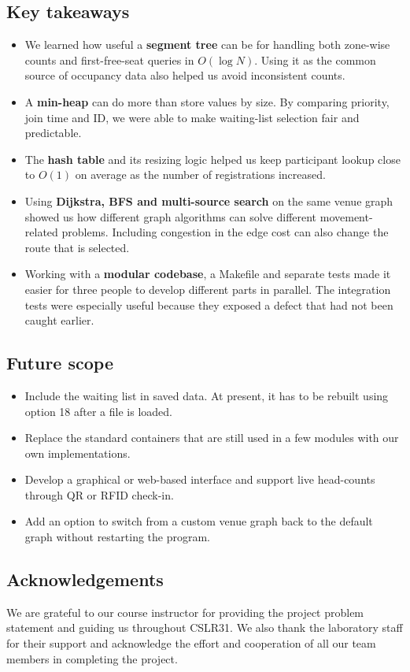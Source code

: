 \documentclass[11pt,a4paper]{article}
\begin{document}
\subsection{Key takeaways}
\begin{itemize}
  \item We learned how useful a \textbf{segment tree} can be for handling both zone-wise counts and first-free-seat queries in $O(\log N)$. Using it as the common source of occupancy data also helped us avoid inconsistent counts.
  \item A \textbf{min-heap} can do more than store values by size. By comparing priority, join time and ID, we were able to make waiting-list selection fair and predictable.
  \item The \textbf{hash table} and its resizing logic helped us keep participant lookup close to $O(1)$ on average as the number of registrations increased.
  \item Using \textbf{Dijkstra, BFS and multi-source search} on the same venue graph showed us how different graph algorithms can solve different movement-related problems. Including congestion in the edge cost can also change the route that is selected.
  \item Working with a \textbf{modular codebase}, a Makefile and separate tests made it easier for three people to develop different parts in parallel. The integration tests were especially useful because they exposed a defect that had not been caught earlier.
\end{itemize}

\subsection{Future scope}
\begin{itemize}
  \item Include the waiting list in saved data. At present, it has to be rebuilt using option 18 after a file is loaded.
  \item Replace the standard containers that are still used in a few modules with our own implementations.
  \item Develop a graphical or web-based interface and support live head-counts through QR or RFID check-in.
  \item Add an option to switch from a custom venue graph back to the default graph without restarting the program.
\end{itemize}

\subsection{Acknowledgements}
We are grateful to our course instructor for providing the project problem
statement and guiding us throughout CSLR31. We also thank the laboratory staff
for their support and acknowledge the effort and cooperation of all our team
members in completing the project.
\end{document}
